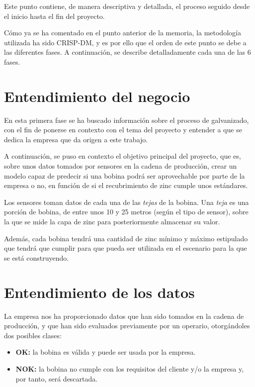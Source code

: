 
Este punto contiene, de manera descriptiva y detallada, el proceso seguido desde el inicio hasta el fin del proyecto. 

Cómo ya se ha comentado en el punto anterior de la memoria, la metodología utilizada ha sido CRISP-DM, y es por ello que el orden de este punto se debe a las diferentes fases. A continuación, se describe detalladamente cada una de las 6 fases.

\section{Entendimiento del negocio}
En esta primera fase se ha buscado información sobre el proceso de galvanizado, con el fin de ponerse en contexto con el tema del proyecto y entender a que se dedica la empresa que da origen a este trabajo. 

A continuación, se puso en contexto el objetivo principal del proyecto, que es, sobre unos datos tomados por sensores en la cadena de producción, crear un modelo capaz de predecir si una bobina podrá ser aprovechable por parte de la empresa o no, en función de si el recubrimiento de zinc cumple unos estándares.

Los sensores toman datos de cada una de las \emph{tejas} de la bobina. Una \emph{teja} es una porción de bobina, de entre unos 10 y 25 metros (según el tipo de sensor), sobre la que se mide la capa de zinc para posteriormente almacenar su valor.

Además, cada bobina tendrá una cantidad de zinc mínimo y máximo estipulado que tendrá que cumplir para que pueda ser utilizada en el escenario para la que se está construyendo. 

\section{Entendimiento de los datos}
La empresa nos ha proporcionado datos que han sido tomados en la cadena de producción, y que han sido evaluados previamente por un operario, otorgándoles dos posibles clases:
\begin{itemize}
    \item \textbf{OK:} la bobina es válida y puede ser usada por la empresa. 
    \item \textbf{NOK:} la bobina no cumple con los requisitos del cliente y/o la empresa y, por tanto, será descartada.
\end{itemize}

